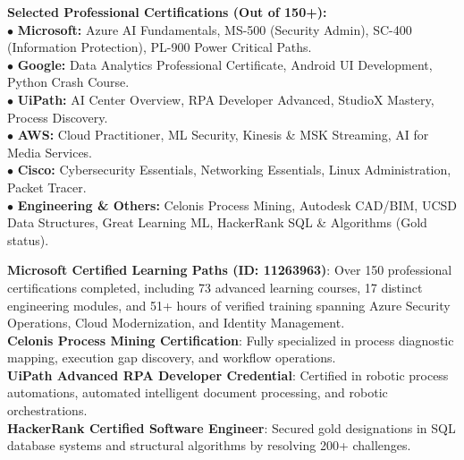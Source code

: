 \documentclass[letterpaper,10pt]{article}
\begin{document}
\begin{itemize}[leftmargin=0.15in, label={}]
  \small{\item{
    \textbf{Selected Professional Certifications (Out of 150+):} \\ \vspace{1pt}
    \quad $\bullet$ \textbf{Microsoft:} Azure AI Fundamentals, MS-500 (Security Admin), SC-400 (Information Protection), PL-900 Power Critical Paths. \\
    \quad $\bullet$ \textbf{Google:} Data Analytics Professional Certificate, Android UI Development, Python Crash Course. \\
    \quad $\bullet$ \textbf{UiPath:} AI Center Overview, RPA Developer Advanced, StudioX Mastery, Process Discovery. \\
    \quad $\bullet$ \textbf{AWS:} Cloud Practitioner, ML Security, Kinesis \& MSK Streaming, AI for Media Services. \\
    \quad $\bullet$ \textbf{Cisco:} Cybersecurity Essentials, Networking Essentials, Linux Administration, Packet Tracer. \\
    \quad $\bullet$ \textbf{Engineering \& Others:} Celonis Process Mining, Autodesk CAD/BIM, UCSD Data Structures, Great Learning ML, HackerRank SQL \& Algorithms (Gold status). \\ \vspace{4pt}
    
    \textbf{Microsoft Certified Learning Paths (ID: 11263963)}{: Over 150 professional certifications completed, including 73 advanced learning courses, 17 distinct engineering modules, and 51+ hours of verified training spanning Azure Security Operations, Cloud Modernization, and Identity Management.} \\ \vspace{2pt}
    \textbf{Celonis Process Mining Certification}{: Fully specialized in process diagnostic mapping, execution gap discovery, and workflow operations.} \\ \vspace{2pt}
    \textbf{UiPath Advanced RPA Developer Credential}{: Certified in robotic process automations, automated intelligent document processing, and robotic orchestrations.} \\ \vspace{2pt}
    \textbf{HackerRank Certified Software Engineer}{: Secured gold designations in SQL database systems and structural algorithms by resolving 200+ challenges.} \\ \vspace{4pt}
    
}}
\end{itemize}
\end{document}
